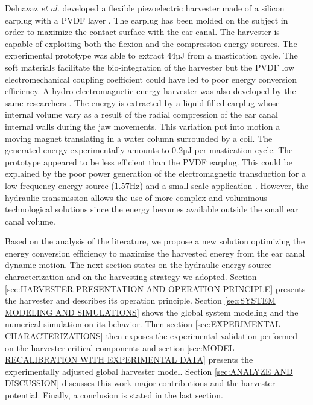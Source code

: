 \documentclass[3p,twocolumn,preprint]{elsarticle}
\begin{document}
Delnavaz \emph{et al.} developed a flexible piezoelectric harvester made of a silicon earplug with a PVDF layer \cite{Delnavaz2013}. The earplug has been molded on the subject in order to maximize the contact surface with the ear canal. The harvester is capable of exploiting both the flexion and the compression energy sources. The experimental prototype was able to extract $44$µJ from a mastication cycle. The soft materials facilitate the bio-integration of the harvester but the PVDF low electromechanical coupling coefficient could have led to poor energy conversion efficiency. A hydro-electromagnetic energy harvester was also developed by the same researchers \cite{Delnavaz2012}. The energy is extracted by a liquid filled earplug whose internal volume vary as a result of the radial compression of the ear canal internal walls during the jaw movements. This variation put into motion a moving magnet translating in a water column surrounded by a coil. The generated energy experimentally amounts to 0.2µJ per mastication cycle. The prototype appeared to be less efficient than the PVDF earplug. This could be explained by the poor power generation of the electromagnetic transduction for a low frequency energy source (1.57Hz) and a small scale application \cite{Kulah2008,Priya2017}. However, the hydraulic transmission allows the use of more complex and voluminous technological solutions since the energy becomes available outside the small ear canal volume.

Based on the analysis of the literature, we propose a new solution optimizing the energy conversion efficiency to maximize the harvested energy from the ear canal dynamic motion. The next section states on the hydraulic energy source characterization and on the harvesting strategy we adopted. Section \ref{sec:HARVESTER PRESENTATION AND OPERATION PRINCIPLE} presents the harvester and describes its operation principle. Section \ref{sec:SYSTEM MODELING AND SIMULATIONS} shows the global system  modeling and the numerical simulation on its behavior. Then section \ref{sec:EXPERIMENTAL CHARACTERIZATIONS} then exposes the experimental validation performed on the harvester critical components and section \ref{sec:MODEL RECALIBRATION WITH EXPERIMENTAL DATA} presents the experimentally adjusted global harvester model. Section \ref{sec:ANALYZE AND DISCUSSION} discusses this work major contributions and the harvester potential. Finally, a conclusion is stated in the last section.

\end{document}
